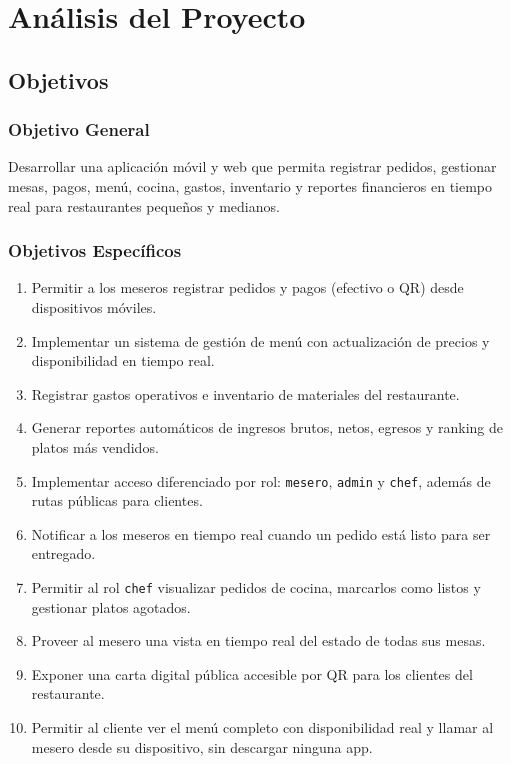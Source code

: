\chapter{Análisis del Proyecto}

\section{Objetivos}

\subsection{Objetivo General}

Desarrollar una aplicación móvil y web que permita registrar pedidos, gestionar
mesas, pagos, menú, cocina, gastos, inventario y reportes financieros en tiempo
real para restaurantes pequeños y medianos.

\subsection{Objetivos Específicos}

\begin{enumerate}[leftmargin=1.8em]
  \item Permitir a los meseros registrar pedidos y pagos (efectivo o QR) desde
        dispositivos móviles.
  \item Implementar un sistema de gestión de menú con actualización de precios y
        disponibilidad en tiempo real.
  \item Registrar gastos operativos e inventario de materiales del restaurante.
  \item Generar reportes automáticos de ingresos brutos, netos, egresos y ranking
        de platos más vendidos.
  \item Implementar acceso diferenciado por rol: \texttt{mesero}, \texttt{admin} y
        \texttt{chef}, además de rutas públicas para clientes.
  \item Notificar a los meseros en tiempo real cuando un pedido está listo para
        ser entregado.
  \item Permitir al rol \texttt{chef} visualizar pedidos de cocina, marcarlos como
        listos y gestionar platos agotados.
  \item Proveer al mesero una vista en tiempo real del estado de todas sus mesas.
  \item Exponer una carta digital pública accesible por QR para los clientes del
        restaurante.
  \item Permitir al cliente ver el menú completo con disponibilidad real y llamar
        al mesero desde su dispositivo, sin descargar ninguna app.
\end{enumerate}

